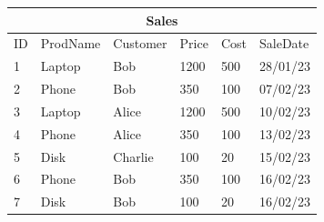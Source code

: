 \documentclass{vldb}
\begin{document}
\begin{table}[t]
	\setlength\tabcolsep{3.5pt}
	\small
	\begin{minipage}{0.5\textwidth}
		\centering
		\begin{tabular}{llllll}
			\multicolumn{6}{c}{\textbf{Sales}} \vspace{0.4em} \\%
					\hline
			\multicolumn{1}{|l|}{ID} & \multicolumn{1}{l|}{ProdName} & \multicolumn{1}{l|}{Customer} & \multicolumn{1}{l|}{Price} & \multicolumn{1}{l|}{Cost} & \multicolumn{1}{l|}{SaleDate} \\ \hline
			\multicolumn{1}{|l|}{1}  & \multicolumn{1}{l|}{Laptop}      & \multicolumn{1}{l|}{Bob}      & \multicolumn{1}{l|}{1200}       & \multicolumn{1}{l|}{500} & \multicolumn{1}{l|}{28/01/23} \\
			\multicolumn{1}{|l|}{2}  & \multicolumn{1}{l|}{Phone}      & \multicolumn{1}{l|}{Bob}      & \multicolumn{1}{l|}{350}       & \multicolumn{1}{l|}{100} & \multicolumn{1}{l|}{07/02/23} \\
			\multicolumn{1}{|l|}{3}  & \multicolumn{1}{l|}{Laptop}      & \multicolumn{1}{l|}{Alice}      & \multicolumn{1}{l|}{1200}      & \multicolumn{1}{l|}{500} & \multicolumn{1}{l|}{10/02/23} \\
			\multicolumn{1}{|l|}{4}  & \multicolumn{1}{l|}{Phone}      & \multicolumn{1}{l|}{Alice}      & \multicolumn{1}{l|}{350}       & \multicolumn{1}{l|}{100} & \multicolumn{1}{l|}{13/02/23} \\
			\multicolumn{1}{|l|}{5}  & \multicolumn{1}{l|}{Disk}      & \multicolumn{1}{l|}{Charlie}      & \multicolumn{1}{l|}{100}        & \multicolumn{1}{l|}{20} & \multicolumn{1}{l|}{15/02/23} \\ 
			\multicolumn{1}{|l|}{6}  & \multicolumn{1}{l|}{Phone}      & \multicolumn{1}{l|}{Bob}      & \multicolumn{1}{l|}{350}       & \multicolumn{1}{l|}{100} & \multicolumn{1}{l|}{16/02/23} \\
			\multicolumn{1}{|l|}{7}  & \multicolumn{1}{l|}{Disk}      & \multicolumn{1}{l|}{Bob}      & \multicolumn{1}{l|}{100}       & \multicolumn{1}{l|}{20} & \multicolumn{1}{l|}{16/02/23} \\ \hline
		\end{tabular}
		\vspace{1em}
		\label{table:sales}
	\end{minipage}
\end{table}
\end{document}
